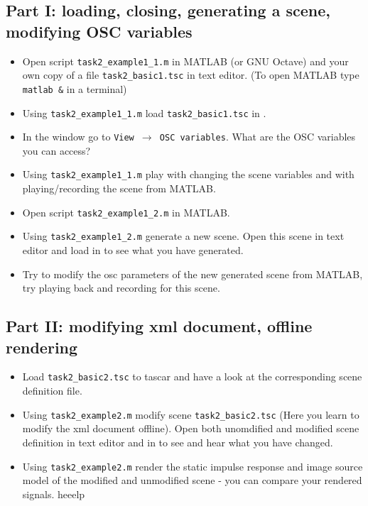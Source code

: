 \documentclass[11pt,a4paper,twoside]{article}
\begin{document}
\subsection*{Part I: loading, closing, generating a scene, modifying OSC variables}
\begin{itemize}

\item Open script \verb!task2_example1_1.m! in MATLAB (or GNU Octave) and your own copy of a file \verb!task2_basic1.tsc! in text editor. (To open MATLAB type  \verb!matlab &! in a terminal) 

\item Using \verb!task2_example1_1.m! load \verb!task2_basic1.tsc! in \tascar{}. 

\item In the \tascar{} window go to \verb!View !$\rightarrow$\verb! OSC variables!. What are the OSC variables you can access? 

\item Using \verb!task2_example1_1.m! play with changing the scene variables and with playing/recording the scene from MATLAB.

\item Open script \verb!task2_example1_2.m! in MATLAB. 

\item Using \verb!task2_example1_2.m! generate a new \tascar{}
  scene. Open this scene in text editor and load in \tascar{} to see
  what you have generated.

\item Try to modify the osc parameters of the new generated scene from
  MATLAB, try playing back and recording for this scene.
\end{itemize}
\subsection*{Part II: modifying xml document, offline rendering}
\begin{itemize}

\item Load \verb!task2_basic2.tsc! to tascar and have a look at the corresponding scene definition file. 

\item Using \verb!task2_example2.m! modify scene \verb!task2_basic2.tsc! (Here you learn to modify the xml document offline). Open both unomdified and modified scene definition in text editor and in \tascar{} to see and hear what you have changed.

\item Using \verb!task2_example2.m! render the static impulse response and image source model of the modified and unmodified scene - you can compare your rendered signals. heeelp

\end{itemize}
\end{document}
